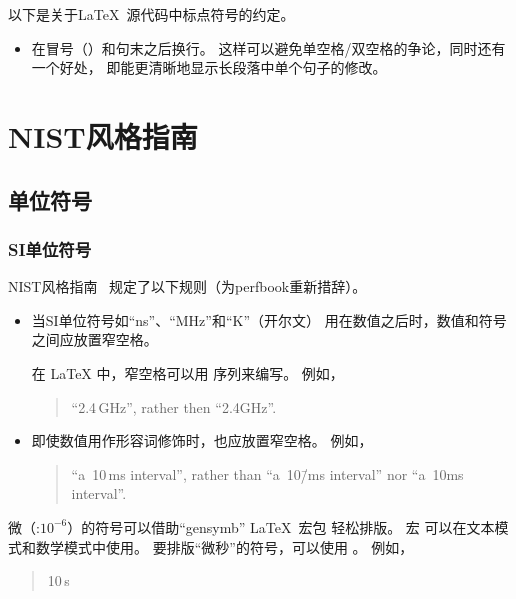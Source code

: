 以下是关于\LaTeX\ 源代码中标点符号的约定。

\begin{itemize}
\item 在冒号（\co{:}）和句末之后换行。
  这样可以避免单空格/双空格的争论，同时还有一个好处，
  即能更清晰地显示长段落中单个句子的修改。
\end{itemize}

\section{NIST风格指南}
\label{sec:app:styleguide:NIST Style Guide}

\subsection{单位符号}
\label{sec:app:styleguide:Unit Symbol}

\subsubsection{SI单位符号}
\label{sec:app:styleguide:SI Unit Symbol}

NIST风格指南~\cite[Chapter 5]{NIST:SP:330:2019}
规定了以下规则（为perfbook重新措辞）。

\begin{itemize}
\item 当SI单位符号如``ns''、``MHz''和``K''（开尔文）
用在数值之后时，数值和符号之间应放置窄空格。

在 \LaTeX{} 中，窄空格可以用 \qco{\\,} 序列来编写。
例如，
\begin{quote}
  ``2.4\,GHz'', rather then ``2.4GHz''.
\end{quote}

\item 即使数值用作形容词修饰时，也应放置窄空格。
  例如，
\begin{quote}
  ``a~10\,ms interval'', rather than ``a~10\=/ms interval'' nor
  ``a~10ms interval''.
\end{quote}
\end{itemize}

微（\micro :$10^{-6}$）的符号可以借助``gensymb'' \LaTeX\ 宏包
轻松排版。
宏 \qco{\\micro} 可以在文本模式和数学模式中使用。
要排版“微秒”的符号，可以使用
。
例如，
\begin{quote}
  10\,\micro s
\end{quote}

